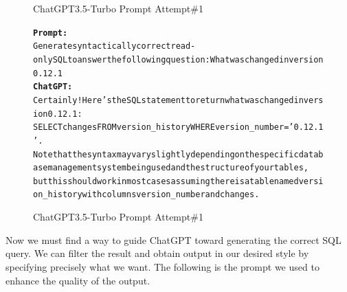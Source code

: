 \begin{figure}[H]
    \begin{AIbox}{ChatGPT3.5-Turbo Prompt Attempt\#1}
        \vspace{-5px}
        \parbox{1\textwidth}{\scriptsize
        \begin{alltt} \larger
            {\bf Prompt:} \\ 
            Generate syntactically correct read-only SQL to answer the following question: What was changed in version 0.12.1
            \\
            {\bf ChatGPT:} \\
            Certainly! Here's the SQL statement to return what was changed in version 0.12.1:\\
            SELECT changes FROM version\_history WHERE version\_number = '0.12.1'. \\ Note that the syntax may vary slightly depending on the specific database management system being used and the structure of your tables,\\ but this should work in most cases assuming there is a table named version\_history with columns version\_number and changes.
        \end{alltt}
        }
        \vspace{-5px}
    \end{AIbox}
    \caption{ChatGPT3.5-Turbo Prompt Attempt\#1}
\end{figure}

Now we must find a way to guide ChatGPT toward generating the correct SQL query. We can filter the result and obtain output in our desired style by specifying precisely what we want. The following is the prompt we used to enhance the quality of the output.

